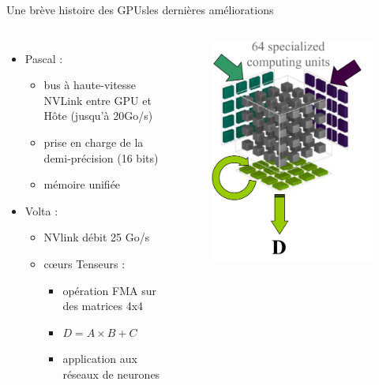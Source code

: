 \documentclass[11pt,mathserif]{beamer}
\begin{document}
\begin{frame}{Une brève histoire des GPUs}{les dernières améliorations}
  \begin{columns}[t]
    \column{6cm}
    \begin{itemize}[<+->]
      \item Pascal :
        \begin{itemize}
          \item bus à haute-vitesse NVLink entre GPU et Hôte (jusqu'à 20Go/s)
          \item prise en charge de la demi-précision (16 bits)
          \item mémoire unifiée
         \end{itemize}
       \item Volta : 
        \begin{itemize}
          \item NVlink débit 25 Go/s
          \item cœurs Tenseurs : 
        \begin{itemize}
          \item opération FMA sur des matrices 4x4
          \item $D = A \times B + C$
          \item application aux réseaux de neurones
         \end{itemize}
        \end{itemize}
    \end{itemize} 
\pause
    \column{5cm}
    \begin{figure}[htbp]
  \includegraphics[width=0.7\linewidth]{fig/tensorCore.png}

\end{figure}
\end{columns}
\end{frame}
\end{document}
